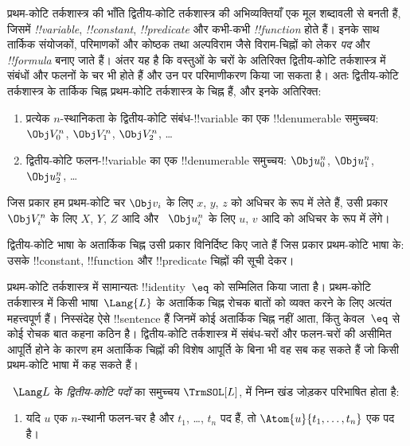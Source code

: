 \documentclass[../../../include/open-logic-section]{subfiles}
\begin{document}


प्रथम-कोटि तर्कशास्त्र की भाँति द्वितीय-कोटि तर्कशास्त्र की अभिव्यक्तियाँ
एक मूल शब्दावली से बनती हैं, जिसमें \emph{!!{variable}},
\emph{!!{constant}}, \emph{!!{predicate}} और कभी-कभी
\emph{!!{function}} होते हैं। इनके साथ तार्किक संयोजकों, परिमाणकों और कोष्ठक
तथा अल्पविराम जैसे विराम-चिह्नों को लेकर \emph{पद} और \emph{!!{formula}}
बनाए जाते हैं। अंतर यह है कि वस्तुओं के चरों के अतिरिक्त द्वितीय-कोटि
तर्कशास्त्र में संबंधों और फलनों के चर भी होते हैं और उन पर परिमाणीकरण किया
जा सकता है। अतः द्वितीय-कोटि तर्कशास्त्र के तार्किक चिह्न प्रथम-कोटि
तर्कशास्त्र के चिह्न हैं, और इनके अतिरिक्त:

\begin{enumerate}
\item प्रत्येक $n$-स्थानिकता के द्वितीय-कोटि संबंध-!!{variable} का एक
  !!{denumerable} समुच्चय: $\Obj V_0^n$, $\Obj V_1^n$, $\Obj V_2^n$, \dots
\item द्वितीय-कोटि फलन-!!{variable} का एक !!{denumerable} समुच्चय:
  $\Obj u_0^n$, $\Obj u_1^n$, $\Obj u_2^n$, \dots
\end{enumerate}

जिस प्रकार हम प्रथम-कोटि चर $\Obj v_i$ के लिए $x$, $y$, $z$ को अधिचर के
रूप में लेते हैं, उसी प्रकार $\Obj V_i^n$ के लिए $X$, $Y$, $Z$ आदि और
~$\Obj u_i^n$ के लिए $u$, $v$ आदि को अधिचर के रूप में लेंगे।

\begin{explain}
द्वितीय-कोटि भाषा के अतार्किक चिह्न उसी प्रकार विनिर्दिष्ट किए जाते हैं जिस
प्रकार प्रथम-कोटि भाषा के: उसके !!{constant}, !!{function} और !!{predicate}
चिह्नों की सूची देकर।

प्रथम-कोटि तर्कशास्त्र में सामान्यतः !!{identity}~$\eq$ को सम्मिलित किया
जाता है। प्रथम-कोटि तर्कशास्त्र में किसी भाषा~$\Lang{L}$ के अतार्किक चिह्न
रोचक बातों को व्यक्त करने के लिए अत्यंत महत्त्वपूर्ण हैं। निस्संदेह ऐसे
!!{sentence} हैं जिनमें कोई अतार्किक चिह्न नहीं आता, किंतु केवल~$\eq$ से कोई
रोचक बात कहना कठिन है। द्वितीय-कोटि तर्कशास्त्र में संबंध-चरों और फलन-चरों
की असीमित आपूर्ति होने के कारण हम अतार्किक चिह्नों की विशेष आपूर्ति के बिना
भी वह सब कह सकते हैं जो किसी प्रथम-कोटि भाषा में कह सकते हैं।
\end{explain}

\begin{defn}[द्वितीय-कोटि पद]
~$\Lang L$ के \emph{द्वितीय-कोटि पदों} का समुच्चय $\TrmSOL[L]$,
 में निम्न खंड जोड़कर परिभाषित होता है:
\begin{enumerate}
\item यदि $u$ एक $n$-स्थानी फलन-चर है और $t_1$, \dots, $t_n$ पद हैं, तो
  $\Atom{u}{t_1, \ldots, t_n}$ एक पद है।
\end{enumerate}
\end{defn}
\end{document}

